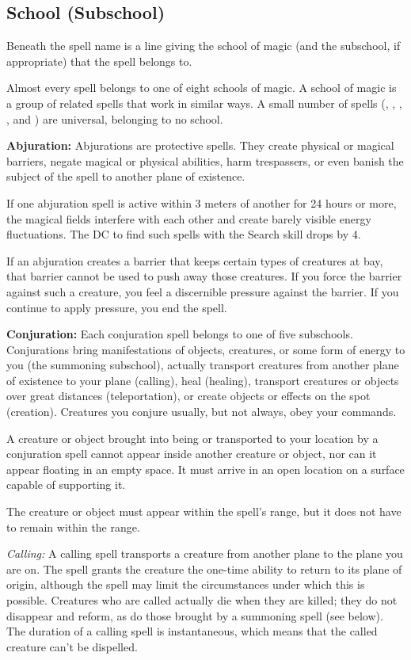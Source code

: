 \subsection{School (Subschool)}
Beneath the spell name is a line giving the school of magic (and the subschool, if appropriate) that the spell belongs to.

Almost every spell belongs to one of eight schools of magic. A school of magic is a group of related spells that work in similar ways. A small number of spells (, , , , and ) are universal, belonging to no school.

\textbf{Abjuration:} Abjurations are protective spells. They create physical or magical barriers, negate magical or physical abilities, harm trespassers, or even banish the subject of the spell to another plane of existence.

If one abjuration spell is active within 3 meters of another for 24 hours or more, the magical fields interfere with each other and create barely visible energy fluctuations. The DC to find such spells with the Search skill drops by 4.

If an abjuration creates a barrier that keeps certain types of creatures at bay, that barrier cannot be used to push away those creatures. If you force the barrier against such a creature, you feel a discernible pressure against the barrier. If you continue to apply pressure, you end the spell.

\textbf{Conjuration:} Each conjuration spell belongs to one of five subschools. Conjurations bring manifestations of objects, creatures, or some form of energy to you (the summoning subschool), actually transport creatures from another plane of existence to your plane (calling), heal (healing), transport creatures or objects over great distances (teleportation), or create objects or effects on the spot (creation). Creatures you conjure usually, but not always, obey your commands.

A creature or object brought into being or transported to your location by a conjuration spell cannot appear inside another creature or object, nor can it appear floating in an empty space. It must arrive in an open location on a surface capable of supporting it.

The creature or object must appear within the spell's range, but it does not have to remain within the range.

\textit{Calling:} A calling spell transports a creature from another plane to the plane you are on. The spell grants the creature the one-time ability to return to its plane of origin, although the spell may limit the circumstances under which this is possible. Creatures who are called actually die when they are killed; they do not disappear and reform, as do those brought by a summoning spell (see below). The duration of a calling spell is instantaneous, which means that the called creature can't be dispelled.

